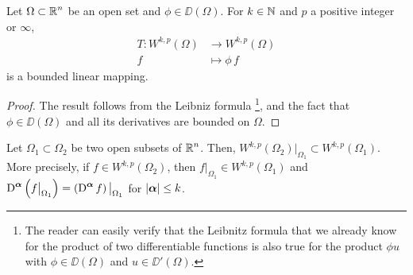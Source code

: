 \begin{prop} \label{sob_T_dd_wkp}
Let $\displaystyle \Omega \subset \mathbb{R}^n$ be an open set and
$\phi \in \DD(\Omega)$.
For $k\in \mathbb{N}$ and $p$ a positive integer or $\infty$,
\begin{align*}
T: W^{k,p}(\Omega) &\rightarrow W^{k,p}(\Omega) \\
f &\mapsto \phi \,f 
\end{align*}
is a bounded linear mapping.
\end{prop}

\begin{proof}
The result follows from the Leibniz formula \footnote{The reader can
easily verify that the Leibnitz formula that we already know for the
product of two differentiable functions
is also true for the product $\phi u$ with $\phi \in \DD(\Omega)$ and
$u \in \DD'(\Omega)$.}, and the fact that $\phi\in \DD(\Omega)$ and
all its derivatives are bounded on $\Omega$.
\end{proof}

\begin{lemma} \label{sobVsubsetU}
Let $\Omega_1 \subset \Omega_2$ be two open subsets of
$\displaystyle \mathbb{R}^n$.  Then,
$\displaystyle W^{k,p}(\Omega_2)\big|_{\Omega_1} \subset W^{k,p}(\Omega_1)$.  More
precisely, if $\displaystyle f \in W^{k,p}(\Omega_2)$, then
$\displaystyle f\big|_{\Omega_1} \in W^{k,p}(\Omega_1)$ and
$\displaystyle \operatorname{D}^{{\bm{\alpha}}} \left(f\big|_{\Omega_1}\right) =
\left( \operatorname{D}^{{\bm{\alpha}}} f \right)\big|_{\Omega_1}$ for
$|{\bm{\alpha}}| \leq k$.
\end{lemma}

